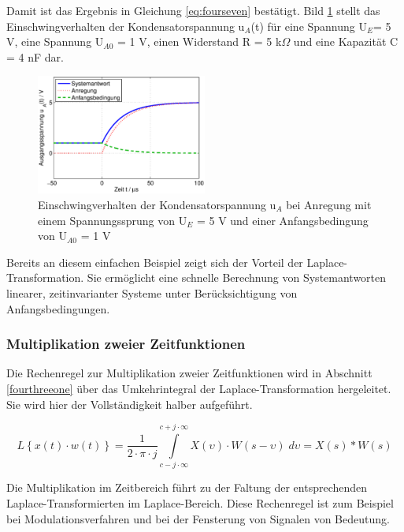 \noindent Damit ist das Ergebnis in Gleichung \eqref{eq:fourseven} bestätigt. Bild \ref{fig:LaplaceSignaleRCEinschwingen} stellt das Einschwingverhalten der Kondensatorspannung u$_{A}$(t) für eine Spannung U$_{E}$= 5 V, eine Spannung U${}_{A0}$ = 1 V, einen Widerstand R = 5 k$\Omega$ und eine Kapazität C = 4 nF dar.

\begin{figure}[H]
  \centerline{\includegraphics[width=0.5\textwidth]{Kapitel3/Bilder/image8}}
  \caption{Einschwingverhalten der Kondensatorspannung u$_{A}$  bei Anregung 
mit einem Spannungssprung \newline von U$_{E}$ = 5 V und einer Anfangsbedingung von U$_{A0}$ = 1 V
}
  \label{fig:LaplaceSignaleRCEinschwingen}
\end{figure}

\noindent Bereits an diesem einfachen Beispiel zeigt sich der Vorteil der Laplace-Transformation. Sie ermöglicht eine schnelle Berechnung von Systemantworten linearer, zeitinvarianter Systeme unter Berücksichtigung von Anfangsbedingungen.

\subsubsection{Multiplikation zweier Zeitfunktionen}

\noindent Die Rechenregel zur Multiplikation zweier Zeitfunktionen wird in Abschnitt \ref{fourthreeone} über das Umkehrintegral der Laplace-Transformation hergeleitet. Sie wird hier der Vollständigkeit halber aufgeführt.

\begin{equation}\label{eq:foureightytwo}
L\left\{x\left(t\right)\cdot w\left(t\right)\right\}=\frac{1}{2\cdot \pi \cdot j} \int\limits _{c-j\cdot \infty }^{c+j\cdot \infty }X\left(\upsilon \right)\cdot W\left(s-\upsilon \right)\;d\upsilon  =X\left(s\right)*W\left(s\right)
\end{equation}

\noindent Die Multiplikation im Zeitbereich führt zu der Faltung der entsprechenden Laplace-Transformierten im Laplace-Bereich. Diese Rechenregel ist zum Beispiel bei Modulationsverfahren und bei der Fensterung von Signalen von Bedeutung.

